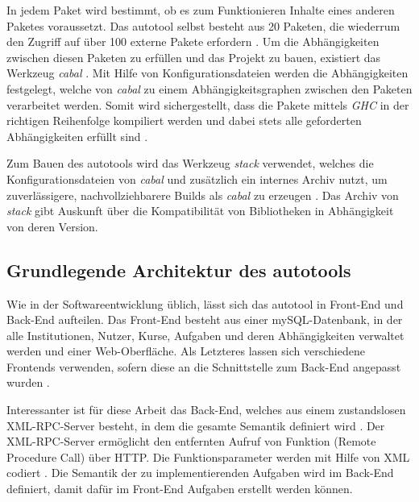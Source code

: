 In jedem Paket wird bestimmt, ob es zum Funktionieren Inhalte eines anderen Paketes voraussetzt. Das autotool selbst besteht aus 20 Paketen, die wiederrum den Zugriff auf über 100 externe Pakete erfordern \cite{ATsoftweng}. 
Um die Abhängigkeiten zwischen diesen Paketen zu erfüllen und das Projekt zu bauen, existiert das Werkzeug \textit{cabal} \cite{cabal}. Mit Hilfe von Konfigurationsdateien werden die Abhängigkeiten festgelegt, welche von \textit{cabal} zu einem Abhängigkeitsgraphen zwischen den Paketen verarbeitet werden. Somit wird sichergestellt, dass die Pakete mittels \textit{GHC} in der richtigen Reihenfolge kompiliert werden und dabei stets alle geforderten Abhängigkeiten erfüllt sind \cite{ATsoftweng}. 

Zum Bauen des autotools wird das Werkzeug \textit{stack} \cite{stack} verwendet, welches die Konfigurationsdateien von \textit{cabal} und zusätzlich ein internes Archiv nutzt, um zuverlässigere, nachvollziehbarere Builds als \textit{cabal} zu erzeugen \cite{ATsoftweng}. Das Archiv von \textit{stack} gibt Auskunft über die Kompatibilität von Bibliotheken in Abhängigkeit von deren Version.

\subsection{Grundlegende Architektur des autotools}
Wie in der Softwareentwicklung üblich, lässt sich das autotool in Front-End und Back-End aufteilen. Das Front-End besteht aus einer mySQL-Datenbank, in der alle Institutionen, Nutzer, Kurse, Aufgaben und deren Abhängigkeiten verwaltet werden und einer Web-Oberfläche. Als Letzteres lassen sich verschiedene Frontends verwenden, sofern diese an die Schnittstelle zum Back-End angepasst wurden \cite{ATnetzw}. 

Interessanter ist für diese Arbeit das Back-End, welches aus einem zustandslosen XML-RPC-Server besteht, in dem die gesamte Semantik definiert wird \cite{ATsembew}. Der XML-RPC-Server ermöglicht den entfernten Aufruf von Funktion (Remote Procedure Call) über HTTP. Die Funktionsparameter werden mit Hilfe von XML codiert \cite{ATxmlrpc}. Die Semantik der zu implementierenden Aufgaben wird im Back-End definiert, damit dafür im Front-End Aufgaben erstellt werden können. 

